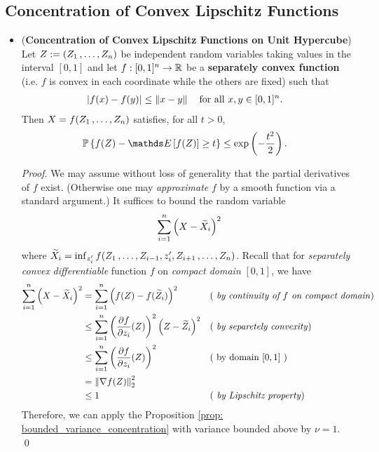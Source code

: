 \documentclass[11pt]{article}
\begin{document}
\subsection{Concentration of Convex Lipschitz Functions}
\begin{itemize}
\item \begin{theorem} (\textbf{Concentration of Convex Lipschitz Functions on Unit Hypercube}) \citep{boucheron2013concentration}\\
Let  $Z:= (Z_1 \,{,}\ldots{,}\, Z_{n})$ be independent random variables taking values in the interval $[0, 1]$ and let $f : [0, 1]^n \to {\mathbb R}$ be a \textbf{separately convex function} (i.e. $f$ is convex in each coordinate while the others are fixed) such that
\begin{align*}
\left\lvert f(x) - f(y) \right\rvert &\le \left\|x - y\right\|_{} \quad \text{for all }x, y \in [0, 1]^n.
\end{align*}
Then $X = f(Z_1 \,{,}\ldots{,}\, Z_{n})$ satisfies, for all $t > 0$,
\begin{align}
\bP\set{f(Z) - \E{}{f(Z)} \ge t } &\le \exp\paren{- \frac{t^2}{2}}. \label{ineqn: convex_lipschitz_concentration}
\end{align}
\end{theorem}
\begin{proof}
We may assume without loss of generality that the partial derivatives of $f$ exist. (Otherwise one may \emph{approximate} $f$ by a smooth function via a standard argument.) It suffices to bound the random variable 
\begin{align*}
\sum_{i=1}^{n}\left(X - \widetilde{X}_{i}\right)^2
\end{align*}
where $\widetilde{X}_{i} = \inf_{z_i'} f(Z_1 \,{,}\ldots{,}\, Z_{i-1}, z_{i}', Z_{i+1} \,{,}\ldots{,}\, Z_n)$. Recall that for \emph{separately convex} \emph{differentiable} function $f$ on \emph{compact domain} $[0,1]$, we have
\begin{align*}
\sum_{i=1}^{n}\left(X - \widetilde{X}_{i}\right)^2 &= \sum_{i=1}^{n}\left(f(Z) - f(\widetilde{Z}_{i})\right)^2  && \text{( \emph{by continuity of $f$ on compact domain})} \\
&\le \sum_{i=1}^{n}\left(\frac{\partial f}{ \partial z_i}(Z)\right)^2\left(Z - \widetilde{Z}_{i}\right)^2 && \text{( \emph{by separetely convexity})}\\
&\le \sum_{i=1}^{n}\left(\frac{\partial f}{ \partial z_i}(Z)\right)^2 && (\text{ by domain $[0,1]$ })\\
&= \left\|\nabla f(Z)\right\|_{2}^2 && \\
&\le 1 && (\text{\emph{ by Lipschitz property}})
\end{align*} Therefore, we can apply the Proposition \ref{prop: bounded_variance_concentration} with variance bounded above by $\nu = 1$. \qed
\end{proof}
\end{itemize}
\end{document}
